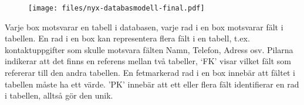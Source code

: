 \documentclass[a4paper, twoside, 11pt, titlepage]{article}
\begin{document}
\begin{figure}[ht] \centering \texttt{[image: files/nyx-databasmodell-final.pdf]} \end{figure} \FloatBarrier

Varje box motsvarar en tabell i databasen, varje rad i en box motsvarar fält i tabellen. En rad i en box kan representera flera fält i en tabell, t.ex. kontaktuppgifter som skulle motsvara fälten Namn, Telefon, Adress osv. Pilarna indikerar att det finns en referens mellan två tabeller, ‘FK’ visar vilket fält som refererar till den andra tabellen. En fetmarkerad rad i en box innebär att fältet i tabellen måste ha ett värde. 'PK' innebär att ett eller flera fält identifierar en rad i tabellen, alltså gör den unik.
\end{document}
